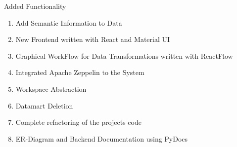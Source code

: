 \documentclass[12pt]{beamer}
\begin{document}
\begin{textblock}{0.5}
\begin{block}{Added Functionality}
	\begin{enumerate}
	\item Add Semantic Information to Data
	\item New Frontend written with React and Material UI
	\item Graphical WorkFlow for Data Transformations written with ReactFlow
	\item Integrated Apache Zeppelin to the System
	\item Workspace Abstraction
	\item Datamart Deletion
	\item Complete refactoring of the projects code
	\item ER-Diagram and Backend Documentation using PyDocs
\end{enumerate}

\vspace{0.5\baselineskip}

\end{block}


\end{textblock}

\end{document}
